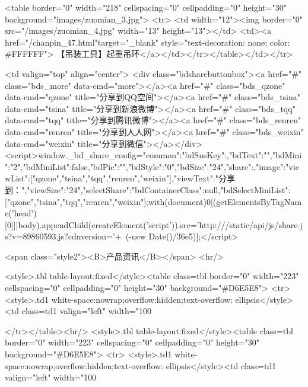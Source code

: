                                                             <table border="0" width="218" cellspacing="0" cellpadding="0" height="30" background="images/zuomian_3.jpg">
                                                                <tr>
                                                                    <td width="12"><img border="0" src="/images/zuomian_4.jpg" width="13" height="13"></td>
                                                                    <td><a href="/chanpin_47.html"target="_blank" style="text-decoration: none; color: #FFFFFF">
                                                                            【吊装工具】起重吊环</a></td></tr></table></td></tr>



<td valign="top" align="center">
<div class="bdsharebuttonbox"><a href="#" class="bds_more" data-cmd="more"></a><a href="#" class="bds_qzone" data-cmd="qzone" title="分享到QQ空间"></a><a href="#" class="bds_tsina" data-cmd="tsina" title="分享到新浪微博"></a><a href="#" class="bds_tqq" data-cmd="tqq" title="分享到腾讯微博"></a><a href="#" class="bds_renren" data-cmd="renren" title="分享到人人网"></a><a href="#" class="bds_weixin" data-cmd="weixin" title="分享到微信"></a></div>
<script>window._bd_share_config={"common":{"bdSnsKey":{},"bdText":"","bdMini":"2","bdMiniList":false,"bdPic":"","bdStyle":"0","bdSize":"24"},"share":{},"image":{"viewList":["qzone","tsina","tqq","renren","weixin"],"viewText":"分享到：","viewSize":"24"},"selectShare":{"bdContainerClass":null,"bdSelectMiniList":["qzone","tsina","tqq","renren","weixin"]}};with(document)0[(getElementsByTagName('head')[0]||body).appendChild(createElement('script')).src='http:///static/api/js/share.js?v=89860593.js?cdnversion='+~(-new Date()/36e5)];</script>

<span class="style2"><B>产品资讯</B></span>
<hr/>

<style>.tbl {table-layout:fixed}</style><table class=tbl border="0" width="223" cellspacing="0" cellpadding="0" height="30" background="#D6E5E8">
<tr>
<style>.td1 {white-space:nowrap;overflow:hidden;text-overflow: ellipsis}</style><td class=td1 valign="left" width="100%

</tr></table><hr/>
<style>.tbl {table-layout:fixed}</style><table class=tbl border="0" width="223" cellspacing="0" cellpadding="0" height="30" background="#D6E5E8">
<tr>
<style>.td1 {white-space:nowrap;overflow:hidden;text-overflow: ellipsis}</style><td class=td1 valign="left" width="100%

